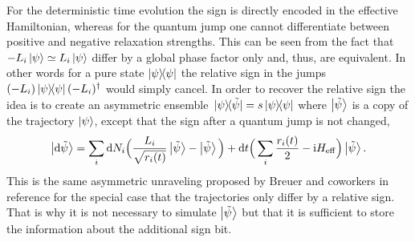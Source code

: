 \documentclass[twocolumn,prl,superscriptaddress]{revtex4-2}
\renewcommand{\i}{\mathrm i}
\begin{document}
For the deterministic time evolution the sign is directly encoded in the effective Hamiltonian, whereas for the quantum jump one cannot differentiate between positive and negative relaxation strengths. This can be seen from the fact that $-L_i\ket\psi \simeq L_i\ket\psi$ differ by a global phase factor only and, thus, are equivalent. In other words for a pure state $\ketbra{\psi}$ the relative sign in the jumps $(-L_i)\ketbra{\psi}(-L_i)^\dagger$ would simply cancel. In order to recover the relative sign the idea is to create an asymmetric ensemble $\dyad*{\psi}{\tilde\psi}=s \dyad{\psi}{\psi}$ where $\ket{\tilde \psi}$ is a copy of the trajectory $\ket \psi$, except that the sign after a quantum jump is not changed,
\begin{align}
	\ket{ \mathrm d\tilde \psi} = \sum_i \mathrm d N_i \Big(\frac{L_i }{\sqrt{ r_i(t)}} \ket{\tilde \psi} - \ket{\tilde \psi} \Big) + \mathrm d t \Big( \sum_i \frac{ r_i(t)}{2} - \i H_\mathrm{eff} \Big) \ket{\tilde \psi}.
	\label{eq:app_ito_formalism_copy}
\end{align}
This is the same asymmetric unraveling proposed by Breuer and coworkers in reference \cite{breuerpetruccione1999} for the special case that the trajectories only differ by a relative sign. That is why it is not necessary to simulate $\ket{\tilde \psi}$ but that it is sufficient to store the information about the additional sign bit. 
\end{document}
